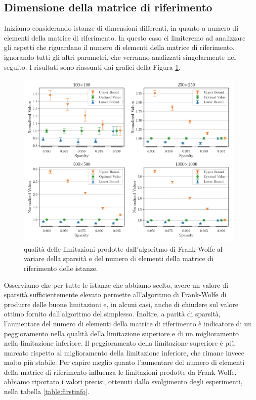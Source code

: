 \subsection{Dimensione della matrice di riferimento}
Iniziamo considerando istanze di dimensioni differenti, in quanto a numero di elementi della matrice di riferimento. In
questo caso ci limiteremo ad analizzare gli aspetti che riguardano il numero di elementi della matrice di riferimento,
ignorando tutti gli altri parametri, che verranno analizzati singolarmente nel seguito. I risultati sono riassunti dai
grafici della Figura \ref{fig:bysize}.
\begin{figure}[ht]
    \centering
    \includegraphics[width=\textwidth]{assets/figures/size.pdf}
    \caption{qualità delle limitazioni prodotte dall'algoritmo di Frank-Wolfe al variare della sparsità e del numero di elementi della
    matrice di riferimento delle istanze.}
    \label{fig:bysize}
\end{figure}

\noindent
Osserviamo che per tutte le istanze che abbiamo scelto, avere un valore di sparsità sufficientemente elevato permette
all'algoritmo di Frank-Wolfe di produrre delle buone limitazioni e, in alcuni casi, anche di chiudere sul valore ottimo
fornito dall'algoritmo del simplesso.
Inoltre, a parità di sparsità, l'aumentare del numero di elementi della matrice di riferimento è indicatore di
un peggioramento nella qualità della limitazione superiore e di un miglioramento nella limitazione inferiore. Il
peggioramento della limitazione superiore è più marcato rispetto al miglioramento della limitazione inferiore, che
rimane invece molto più stabile. Per capire meglio quanto l'aumentare del numero di elementi della matrice di
riferimento influenza le limitazioni prodotte da Frank-Wolfe, abbiamo riportato i valori precisi, ottenuti dallo
svolgimento degli esperimenti, nella tabella \ref{table:firstinfo}.

